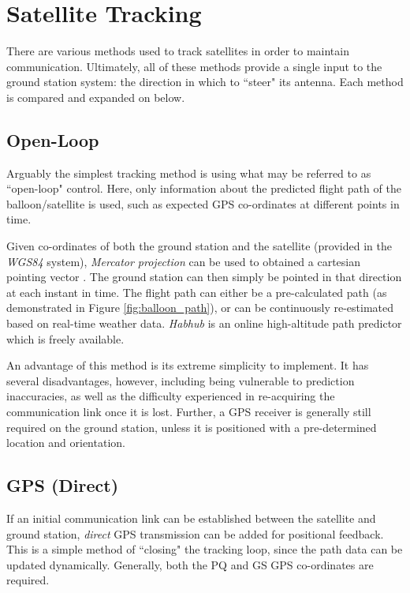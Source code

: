 \graphicspath{{./figures/}}

\section{Satellite Tracking}
There are various methods used to track satellites in order to maintain communication. Ultimately, all of these methods provide a single input to the ground station system: the direction in which to ``steer" its antenna. Each method is compared and expanded on below.

\subsection{Open-Loop}
Arguably the simplest tracking method is using what may be referred to as ``open-loop" control. Here, only information about the predicted flight path of the balloon/satellite is used, such as expected GPS co-ordinates at different points in time.

Given co-ordinates of both the ground station and the satellite (provided in the \textit{WGS84} system), \textit{Mercator projection} can be used to obtained a cartesian pointing vector \cite{site-mercator}. The ground station can then simply be pointed in that direction at each instant in time. The flight path can either be a pre-calculated path (as demonstrated in Figure \ref{fig:balloon_path}), or can be continuously re-estimated based on real-time weather data. \textit{Habhub} is an online high-altitude path predictor \cite{site-stratoballooningPredictionTracking} which is freely available.

An advantage of this method is its extreme simplicity to implement. It has several disadvantages, however, including being vulnerable to prediction inaccuracies, as well as the difficulty experienced in re-acquiring the communication link once it is lost. Further, a GPS receiver is generally still required on the ground station, unless it is positioned with a pre-determined location and orientation.

\subsection{GPS (Direct)}
If an initial communication link can be established between the satellite and ground station, \textit{direct} GPS transmission can be added for positional feedback. This is a simple method of ``closing" the tracking loop, since the path data can be updated dynamically. Generally, both the PQ and GS GPS co-ordinates are required.


